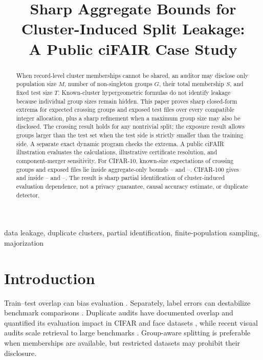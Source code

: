 \documentclass[conference,10pt]{IEEEtran}
\title{Sharp Aggregate Bounds for Cluster-Induced Split Leakage:\\
A Public ciFAIR Case Study}
\author{\IEEEauthorblockN{Nikhil Mahesh}\IEEEauthorblockA{Pioneer Research}}
\begin{document}
\setlength{\textfloatsep}{6pt plus 1pt minus 1pt}
\setlength{\dbltextfloatsep}{6pt plus 1pt minus 1pt}
\setlength{\floatsep}{5pt plus 1pt minus 1pt}
\maketitle

\begin{abstract}
When record-level cluster memberships cannot be shared, an auditor may disclose only population size $M$, number of non-singleton groups $G$, their total membership $S$, and fixed test size $T$. Known-cluster hypergeometric formulas do not identify leakage because individual group sizes remain hidden. This paper proves sharp closed-form extrema for expected crossing groups and exposed test files over every compatible integer allocation, plus a sharp refinement when a maximum group size may also be disclosed. The crossing result holds for any nontrivial split; the exposure result allows groups larger than the test set when the test side is strictly smaller than the training side. A separate exact dynamic program checks the extrema. A public ciFAIR illustration evaluates the calculations, illustrative certificate resolution, and component-merger sensitivity. For CIFAR-10, known-size expectations of \CifarTenKnownCross{} crossing groups and \CifarTenKnownExposed{} exposed files lie inside aggregate-only bounds \CifarTenCrossMin--\CifarTenCrossMax{} and \CifarTenExposedMin--\CifarTenExposedMax{}. CIFAR-100 gives \CifarHundredKnownCross{} and \CifarHundredKnownExposed{} inside \CifarHundredCrossMin--\CifarHundredCrossMax{} and \CifarHundredExposedMin--\CifarHundredExposedMax{}. The result is sharp partial identification of cluster-induced evaluation dependence, not a privacy guarantee, causal accuracy estimate, or duplicate detector.
\end{abstract}

\begin{IEEEkeywords}
data leakage, duplicate clusters, partial identification, finite-population sampling, majorization
\end{IEEEkeywords}

\section{Introduction}
Train--test overlap can bias evaluation \cite{kapoor2023}. Separately, label errors can destabilize benchmark comparisons \cite{northcutt2021}. Duplicate audits have documented overlap and quantified its evaluation impact in CIFAR and face datasets \cite{barz2020,schlett2024}, while recent visual audits scale retrieval to large benchmarks \cite{ramos2025,adimoolam2026}. Group-aware splitting is preferable when memberships are available, but restricted datasets may prohibit their disclosure.
\end{document}
